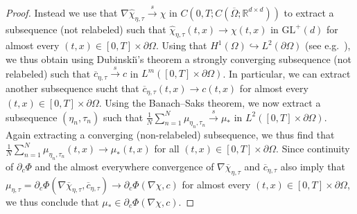 \documentclass[a4paper,12pt]{article}
\newcommand{\R}{\mathbb{R}}
\newcommand{\pl}{\partial}
\newcommand{\wb}{\overline}
\newcommand{\chibar}{\overline{\chi}}
\newcommand{\chihat}{\widehat{\chi}}
\newcommand{\cbar}{\overline{c}}
\newcommand{\GL}{\mathrm{GL}}
\newcommand{\sto}{\xrightarrow{s}}
\theoremstyle{plain}
\theoremstyle{definition}
\numberwithin{equation}{section}
\begin{document}
\begin{proof}
Instead we use that $\nabla\chihat_{\eta,\tau} \sto \chi$ in $C(0,T;C(\wb\Omega;\R^{d\times d}))$ to extract a subsequence (not relabeled) such that $\chihat_{\eta,\tau}(t,x)\to \chi(t,x)$ in $\GL^+(d)$ for almost every $(t,x)\in [0,T]\times \pl\Omega$. Using that $H^1(\Omega)\hookrightarrow L^2(\pl\Omega)$ (see e.g.\ \cite[Theorem 1.1]{Bieg2009ToSFoBoED}), we thus obtain using Dubinski\u\i's theorem a strongly converging subsequence (not relabeled) such that $\cbar_{\eta,\tau}\sto c$ in $L^m([0,T]\times \pl\Omega)$. In particular, we can extract another subsequence sucht that $\cbar_{\eta,\tau}(t,x)\to c(t,x)$ for almost every $(t,x)\in [0,T]\times \pl\Omega$. 
Using the Banach--Saks theorem, we now extract a subsequence $(\eta_n,\tau_n)$ such that $\frac{1}{N}\sum_{n=1}^N \mu_{{\eta_n},{\tau_n}}\sto \mu_*$ in $L^2([0,T]\times \pl\Omega)$. Again extracting a converging (non-relabeled) subsequence, 
we thus find that $\frac{1}{N}\sum_{n=1}^N \mu_{{\eta_n},{\tau_n}}(t,x)\to \mu_*(t,x)$ for all $(t,x)\in [0,T]\times \pl\Omega$. Since continuity of $\pl_c\Phi$ and the almost everywhere convergence of $\nabla\chibar_{\eta,\tau}$ and $\cbar_{\eta,\tau}$ also imply that $\mu_{\eta,\tau} = \pl_c\Phi(\nabla\chibar_{\eta,\tau},\cbar_{\eta,\tau}) \to \pl_c\Phi(\nabla\chi,c)$ for almost every $(t,x)\in [0,T]\times \pl\Omega$, we thus conclude that $\mu_*\in \pl_c\Phi(\nabla\chi,c)$.

%


\end{proof}
%

%
%
%
%
%
%
  
  
%
%
%
%
%
%
	
	
%
%
%
%
%
%
%
%
%
%
%
%
%
%
%
%
%
%
%
%
%
	
	
	
	
%
%
%
%
%
%
%
%
%
%
	




%

%
%
%

%
%

%
%
%
%
%
%
%
%
%
%
%
%
%
%
%
%
%
%
%
%
%
%
%

%
	
%

%
%
%
%
%
%

%
%
%
%
%
%

%
%

%
%
%
%
%

%
%
%
%
%
%

%
%
%
%
%
%
%
%
%

%
\end{document}
